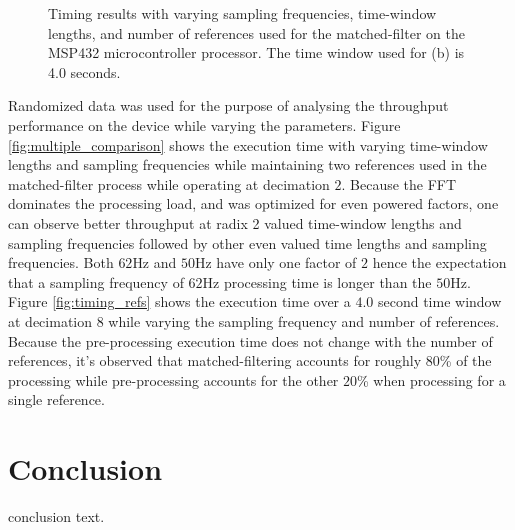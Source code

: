 \documentclass[journal]{IEEEtran}
\begin{document}
\begin{figure}[!ht]
   \centering
   \quad
   \caption{Timing results with varying sampling frequencies, time-window lengths, and number of references used for the matched-filter on the MSP432 microcontroller processor. The time window used for (b) is 4.0 seconds.}
   \label{fig:timing}
\end{figure}
%
Randomized data was used for the purpose of analysing the throughput performance on the device while varying the parameters.
Figure \ref{fig:multiple_comparison} shows the execution time with varying time-window lengths and sampling frequencies while maintaining two references used in the matched-filter process while operating at decimation $2$.
Because the FFT dominates the processing load, and was optimized for even powered factors, one can observe better throughput at radix 2 valued time-window lengths and sampling frequencies followed by other even valued time lengths and sampling frequencies. Both $62$Hz and $50$Hz have only one factor of $2$ hence the expectation that a sampling frequency of $62$Hz processing time is longer than the $50$Hz.
Figure \ref{fig:timing_refs} shows the execution time over a $4.0$ second time window at decimation $8$ while varying the sampling frequency and number of references. Because the pre-processing execution time does not change with the number of references, it's observed that matched-filtering accounts for roughly $80$\% of the processing while pre-processing accounts for the other $20$\% when processing for a single reference.
%
\section{Conclusion}
conclusion text.
%
\appendices
%
\ifCLASSOPTIONcaptionsoff
  \newpage
\fi
%


\end{document}
